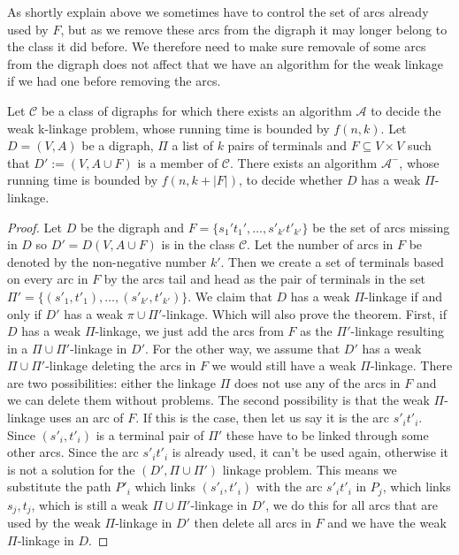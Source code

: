 As shortly explain above we sometimes have to control the set of arcs already used by $F$, but as we remove these arcs from the digraph it may longer belong to the class it did before. 
We therefore need to make sure removale of some arcs from the digraph does not affect that we have an algorithm for the weak linkage if we had one before removing the arcs.
\begin{lemma}
    Let $\mathcal{C}$ be a class of digraphs for which there exists an algorithm $\mathcal{A}$ to decide the weak k-linkage problem, whose running time is bounded by $f(n,k)$. Let $D=(V,A)$ be a digraph, $\Pi$ a list of $k$ pairs of terminals and $F\subseteq V\times V$ such that $D':= (V,A\cup F)$ is a member of $\mathcal{C}$. There exists an algorithm  $\mathcal{A}^-$, whose running time is bounded by $f(n,k+|F|)$, to decide whether $D$ has a weak $\Pi$-linkage.
    \label{lemma:deletarcs}
\end{lemma}
\begin{proof}
    Let $D$ be the digraph and $F=\lbrace s_1't_1',\dots ,s'_{k'}t'_{k'}\rbrace$ be the set of arcs missing in $D$ so $D'=D(V,A\cup F)$ is in the class $\mathcal{C}$. 
    Let the number of arcs in $F$ be denoted by the non-negative number $k'$. 
    Then we create a set of terminals based on every arc in $F$ by the arcs tail and head as the pair of terminals in the set $\Pi'=\lbrace (s'_1,t'_1),\dots ,(s'_{k'},t'_{k'})\rbrace$. 
    We claim that $D$ has a weak $\Pi$-linkage if and only if $D'$ has a weak $\pi \cup \Pi'$-linkage. 
    Which will also prove the theorem. 
    First, if $D$ has a weak $\Pi$-linkage, we just add the arcs from $F$ as the $\Pi'$-linkage resulting in a $\Pi \cup \Pi'$-linkage in $D'$. 
    For the other way, we assume that $D'$ has a weak $\Pi \cup \Pi'$-linkage deleting the arcs in $F$ we would still have a weak $\Pi$-linkage. 
    There are two possibilities: either the linkage $\Pi$ does not use any of the arcs in $F$ and we can delete them without problems.
    The second possibility is that the weak $\Pi$-linkage uses an arc of $F$.
    If this is the case, then let us say it is the arc $s'_it'_i$. 
    Since $(s'_i,t'_i)$ is a terminal pair of $\Pi'$ these have to be linked through some other arcs. 
    Since the arc $s'_it'_i$ is already used, it can't be used again, otherwise it is not a solution for the $(D',\Pi \cup \Pi')$ linkage problem.
    This means we substitute the path $P'_i$ which links $(s'_i,t'_i)$ with the arc $s'_it'_i$ in $P_j$, which links $s_j,t_j$, which is still a weak $\Pi \cup \Pi'$-linkage in $D'$, we do this for all arcs that are used by the weak $\Pi$-linkage in $D'$ then delete all arcs in $F$ and we have the weak $\Pi$-linkage in $D$.
\end{proof}


